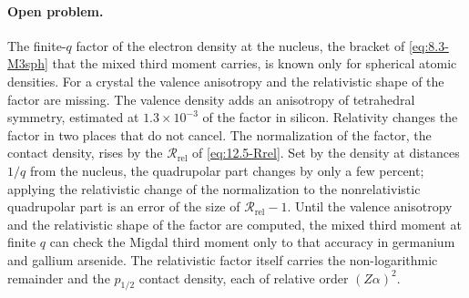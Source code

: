 \paragraph{Open problem.} The finite-$q$ factor of the electron density at the nucleus, the bracket of \cref{eq:8.3-M3sph} that the mixed third moment carries, is known only for spherical atomic densities. For a crystal the valence anisotropy and the relativistic shape of the factor are missing. The valence density adds an anisotropy of tetrahedral symmetry, estimated at $1.3\times10^{-3}$ of the factor in silicon. Relativity changes the factor in two places that do not cancel. The normalization of the factor, the contact density, rises by the $\mathcal{R}_{\mathrm{rel}}$ of \cref{eq:12.5-Rrel}. Set by the density at distances $1/q$ from the nucleus, the quadrupolar part changes by only a few percent; applying the relativistic change of the normalization to the nonrelativistic quadrupolar part is an error of the size of $\mathcal{R}_{\mathrm{rel}} - 1$. Until the valence anisotropy and the relativistic shape of the factor are computed, the mixed third moment at finite $q$ can check the Migdal third moment only to that accuracy in germanium and gallium arsenide. The relativistic factor itself carries the non-logarithmic remainder and the $p_{1/2}$ contact density, each of relative order $(Z\alpha)^2$.
